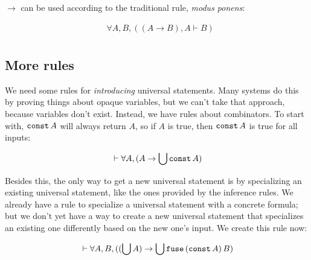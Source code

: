 \documentclass{article}
\begin{document}
  $\to$ can be used according to the traditional rule, \emph{modus ponens}:
  
  \begin{align*}
    &\forall A,B, ((A \to B), A \vdash B)\\
  \end{align*}
  
    
  \subsection{More rules}
  
  We need some rules for \emph{introducing} universal statements. Many systems do this by proving things about opaque variables, but we can't take that approach, because variables don't exist. Instead, we have rules about combinators. To start with, $\operatorname{\texttt{const}} A$ will always return $A$, so if $A$ is true, then $\operatorname{\texttt{const}} A$ is true for all inputs:
  
  \begin{align*}
    &\vdash \forall A, (A \to \bigcup \operatorname{\texttt{const}} A)\\
  \end{align*}
  
  Besides this, the only way to get a new universal statement is by specializing an existing universal statement, like the ones provided by the inference rules. We already have a rule to specialize a universal statement with a concrete formula; but we don't yet have a way to create a new universal statement that specializes an existing one differently based on the new one's input. We create this rule now:
  
  \begin{align*}
    &\vdash \forall A, B, ((\bigcup A) \to \bigcup \operatorname{\texttt{fuse}}\,(\operatorname{\texttt{const}} A)\,B)\\
  \end{align*}
  
    
\end{document}
